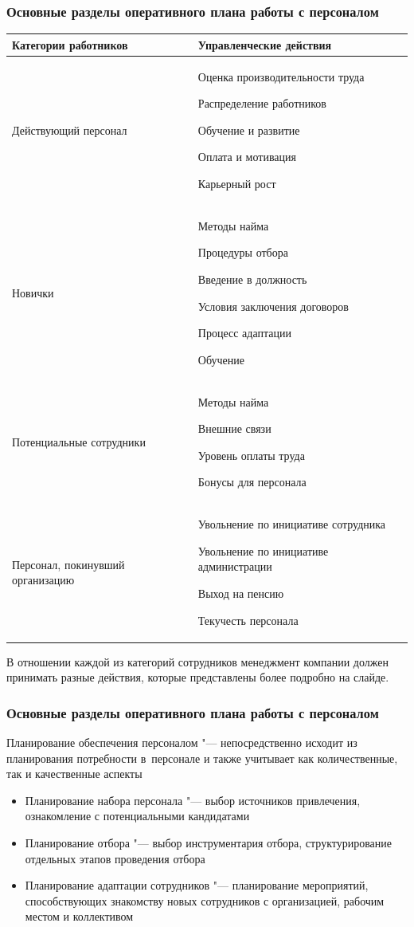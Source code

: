 \documentclass{../industrial-development}
\begin{document}
\begin{frame} \frametitle{Основные разделы оперативного плана работы с персоналом}
\begin{table}[h]
\begin{center}
\begin{tabular}{|p{4cm}|p{5cm}|}
\hline
\tiny \textbf{Категории работников} & \tiny \textbf{Управленческие действия} \\
\hline
\tiny Действующий персонал & \tiny Оценка производительности труда

Распределение работников

Обучение и развитие

Оплата и мотивация

Карьерный рост
 \\
\hline
\tiny Новички & \tiny Методы найма

Процедуры отбора

Введение в должность

Условия заключения договоров

Процесс адаптации

Обучение \\
\hline
\tiny Потенциальные сотрудники & \tiny Методы найма

Внешние связи

Уровень оплаты труда

Бонусы для персонала \\
\hline
\tiny Персонал, покинувший организацию & \tiny Увольнение по инициативе сотрудника 

Увольнение по инициативе администрации

Выход на пенсию

Текучесть персонала \\
\hline
\end{tabular}
\end{center}
\end{table}

\end{frame}

\lecturenotes

В отношении каждой из категорий сотрудников менеджмент компании должен принимать разные действия, которые представлены более подробно на слайде.

\begin{frame} \frametitle{Основные разделы оперативного плана работы с персоналом}
\alert{Планирование обеспечения персоналом} "--- непосредственно исходит из планирования потребности в~персонале и также учитывает как количественные, так и качественные аспекты
  	  \begin{itemize}
	\item {\small Планирование набора персонала "--- выбор источников привлечения, ознакомление с потенциальными кандидатами}
	\item {\small Планирование отбора "--- выбор инструментария отбора, структурирование отдельных этапов проведения отбора}
	\item {\small Планирование адаптации сотрудников "--- планирование мероприятий, способствующих знакомству новых сотрудников с организацией, рабочим местом и коллективом}
	  \end{itemize}
\end{frame}
\end{document}
